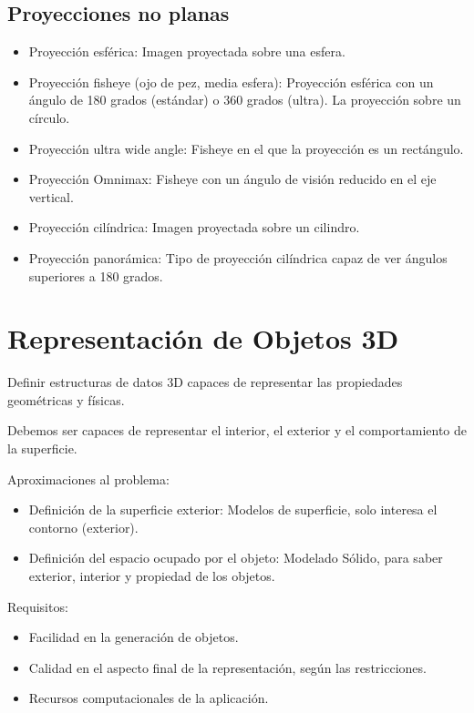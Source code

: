 \subsection{Proyecciones no planas}
\begin{itemize}
    \item Proyección esférica: Imagen proyectada sobre una esfera.
    \item Proyección fisheye (ojo de pez, media esfera): Proyección esférica con un ángulo de 180 grados (estándar) o 360 grados (ultra). La proyección sobre un círculo.
    \item Proyección ultra wide angle: Fisheye en el que la proyección es un rectángulo.
    \item Proyección Omnimax: Fisheye con un ángulo de visión reducido en el eje vertical.
    \item Proyección cilíndrica: Imagen proyectada sobre un cilindro.
    \item Proyección panorámica: Tipo de proyección cilíndrica capaz de ver ángulos superiores a 180 grados.
\end{itemize}

\section{Representación de Objetos 3D}
Definir estructuras de datos 3D capaces de representar las propiedades geométricas y físicas.

Debemos ser capaces de representar el interior, el exterior y el comportamiento de la superficie.

Aproximaciones al problema:
\begin{itemize}
    \item Definición de la superficie exterior: Modelos de superficie, solo interesa el contorno (exterior).
    \item Definición del espacio ocupado por el objeto: Modelado Sólido, para saber exterior, interior y propiedad de los objetos.
\end{itemize}

Requisitos:
\begin{itemize}
    \item Facilidad en la generación de objetos.
    \item Calidad en el aspecto final de la representación, según las restricciones.
    \item Recursos computacionales de la aplicación.
\end{itemize}

